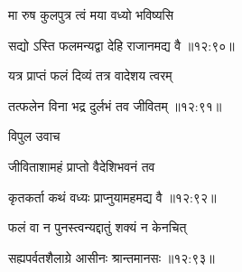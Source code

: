 {\devanagarifont मा रुष कुलपुत्र त्वं मया वध्यो भविष्यसि \thinspace{\dandab} \dontdisplaylinenum }%


{\devanagarifont सद्यो ऽस्ति फलमन्यद्वा देहि राजानमद्य वै {॥१२:९०॥} \veg\dontdisplaylinenum }%

{\devanagarifont यत्र प्राप्तं फलं दिव्यं तत्र वादेशय त्वरम् \thinspace{\dandab} \dontdisplaylinenum }%


{\devanagarifont तत्फलेन विना भद्र दुर्लभं तव जीवितम् {॥१२:९१॥} \veg\dontdisplaylinenum }%
 
{\devanagarifont विपुल उवाच {\dandab}\dontdisplaylinenum  }%
 
{\devanagarifont जीविताशामहं प्राप्तो वैदेशिभवनं तव \thinspace{\danda} \dontdisplaylinenum }%
 

{\devanagarifont कृतकर्ता कथं वध्यः प्राप्नुयामहमद्य वै {॥१२:९२॥} \veg\dontdisplaylinenum }%

{\devanagarifont फलं वा न पुनस्त्वन्यद्दातुं शक्यं न केनचित् \thinspace{\dandab} \dontdisplaylinenum }%


{\devanagarifont सह्यपर्वतशैलाग्रे आसीनः श्रान्तमानसः {॥१२:९३॥} \veg\dontdisplaylinenum }%

